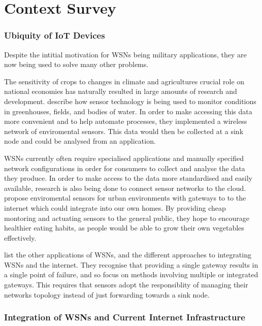 \documentclass[12pt]{article}
\begin{document}
\pagebreak
\part{Context Survey}

\section{Ubiquity of IoT Devices}

Despite the intitial motivation for WSNs being military applications, they are now being used to solve many other problems.

The sensitivity of crops to changes in climate and agricultures crucial role on national economies has naturally resulted in large amounts of research and development. \cite{agrisensor} describe how sensor technology is being used to monitor conditions in greenhouses, fields, and bodies of water. In order to make accessing this data more convenient and to help automate processes, they implemented a wireless network of enviromental sensors. This data would then be collected at a sink node and could be analysed from an application. 

WSNs currently often require specialised applications and manually specified network configurations in order for consumers to collect and analyse the data they produce. In order to make access to the data more standardised and easily available, research is also being done to connect sensor networks to the cloud. \cite{indoor} propose enviromental sensors for urban environments with gateways to to the internet which could integrate into our own homes. By providing cheap montoring and actuating sensors to the general public, they hope to encourage healthier eating habits, as people would be able to grow their own vegetables effectively. 

\cite{wsnlist} list the other applications of WSNs, and the different approaches to integrating WSNs and the internet. They recognise that providing a single gateway results in a single point of failure, and so focus on methods involving multiple or integrated gateways. This requires that sensors adopt the responsiblity of managing their networks topology instead of just forwarding towards a sink node. 

\section{Integration of WSNs and Current Internet Infrastructure}
\end{document}
